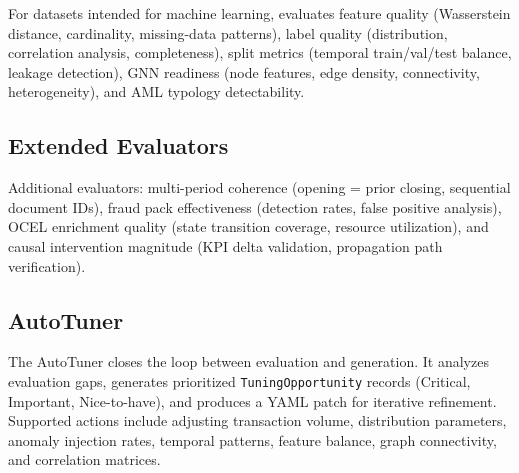 For datasets intended for machine learning, \system{} evaluates
feature quality (Wasserstein distance, cardinality, missing-data
patterns), label quality (distribution, correlation analysis,
completeness), split metrics (temporal train/val/test balance, leakage
detection), GNN readiness (node features, edge density, connectivity,
heterogeneity), and AML typology detectability.

\subsection{Extended Evaluators}
\label{sec:eval_extended}

Additional evaluators: multi-period coherence (opening = prior closing,
sequential document IDs), fraud pack effectiveness (detection rates,
false positive analysis), OCEL enrichment quality (state transition
coverage, resource utilization), and causal intervention magnitude
(KPI delta validation, propagation path verification).

\subsection{AutoTuner}
\label{sec:eval_autotuner}

The AutoTuner closes the loop between evaluation and generation.  It
analyzes evaluation gaps, generates prioritized
\texttt{TuningOpportunity} records (Critical, Important, Nice-to-have),
and produces a YAML patch for iterative refinement.  Supported actions
include adjusting transaction volume, distribution parameters, anomaly
injection rates, temporal patterns, feature balance, graph connectivity,
and correlation matrices.
